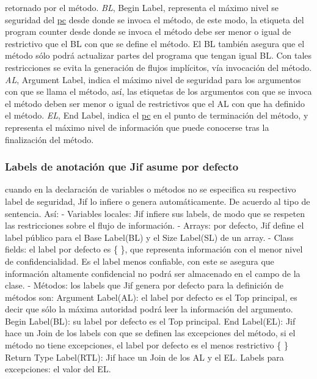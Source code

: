 retornado por el método.\newline 
\emph{BL}, Begin Label, representa el máximo nivel se seguridad del
\underline{pc} desde donde se invoca el método, de este modo,
la etiqueta del program counter desde donde se invoca el método debe ser
menor o igual de restrictivo que el BL con que se define el método. El BL
también asegura que el método sólo podrá actualizar partes del programa que
tengan igual BL. Con tales restricciones se evita la generación de flujos
implícitos, vía invocación del método.\newline
\emph{AL}, Argument Label, indica el máximo nivel de seguridad para los
argumentos con que se llama el método, así, las etiquetas de los argumentos con
que se invoca el método deben ser menor o igual de restrictivos que el AL con que ha
definido el método.\newline 
\emph{EL}, End Label, indica el \underline{pc} en el punto de terminación del
método, y representa el máximo nivel de información que puede conocerse tras la
finalización del método.

\subsubsection{Labels de anotación que Jif asume por defecto}
\label{sssec:default-labels}
cuando en la declaración de variables o métodos no se especifica su respectivo
label de seguridad, Jif lo infiere o genera automáticamente. De acuerdo al tipo
de sentencia. Así:\newline
- Variables locales: Jif infiere sus labels, de modo que se respeten las
restricciones sobre el flujo de información.\newline
- Arrays: por defecto, Jif define el label público para el Base Label(BL) y el
Size Label(SL) de un array.\newline
- Class fields: el label por defecto es \{ \}, que representa información con el
menor nivel de confidencialidad. Es el label menos confiable, con este se
asegura que información altamente confidencial no podrá ser almacenado en el
campo de la clase.\newline
- Métodos: los labels que Jif genera por defecto para la definición de
métodos son:\newline 
Argument Label(AL): el label por defecto es el Top principal, es decir que sólo
la máxima autoridad podrá leer la información del argumento.\newline 
Begin Label(BL): su label por defecto es el Top principal.\newline
End Label(EL): Jif hace un Join de los labels con que se definen las
excepciones del método, si el método no tiene excepciones, el label por defecto
es el menos restrictivo \{ \}\newline
Return Type Label(RTL): Jif hace un Join de los AL y el EL.\newline
Labels para excepciones: el valor del EL.

